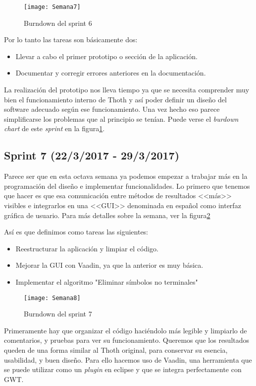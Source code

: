 \begin{figure}[h]
\centering
\texttt{[image: Semana7]}
\caption{Burndown del sprint 6}
\label{fig:A.5}
\end{figure}

Por lo tanto las tareas son básicamente dos:

\begin{itemize}
\item Llevar a cabo el primer prototipo o sección de la aplicación.
\item Documentar y corregir errores anteriores en la documentación.
\end{itemize}

La realización del prototipo nos lleva tiempo ya que se necesita comprender muy bien el funcionamiento interno de Thoth y así poder definir un diseño del software adecuado según ese funcionamiento. Una vez hecho eso parece simplificarse los problemas que al principio se tenían. Puede verse el \emph{burdown chart} de este \emph{sprint} en la figura\ref{fig:A.5}.

\subsection{Sprint 7 (22/3/2017 - 29/3/2017)}

Parece ser que en esta octava semana ya podemos empezar a trabajar más en la programación del diseño e implementar funcionalidades. Lo primero que tenemos que hacer es que esa comunicación entre métodos de resultados <<más>> visibles e integrarlos en una <<GUI>> denominada en español como interfaz gráfica de usuario. Para más detalles sobre la semana, ver la figura\ref{fig:A.6}

Así es que definimos como tareas las siguientes:

\begin{itemize}
\item Reestructurar la aplicación y limpiar el código.
\item Mejorar la GUI con Vaadin, ya que la anterior es muy básica.
\item Implementar el algoritmo "Eliminar símbolos no terminales"
\end{itemize}

\begin{figure}[h]
\centering
\texttt{[image: Semana8]}
\caption{Burndown del sprint 7}
\label{fig:A.6}
\end{figure}

Primeramente hay que organizar el código haciéndolo más legible y limpiarlo de comentarios, y pruebas para ver su funcionamiento. Queremos que los resultados queden de una forma similar al Thoth original, para conservar su esencia, usabilidad, y buen diseño. Para ello hacemos uso de Vaadin, una herramienta que se puede utilizar como un \emph{plugin} en eclipse y que se integra perfectamente con GWT.

